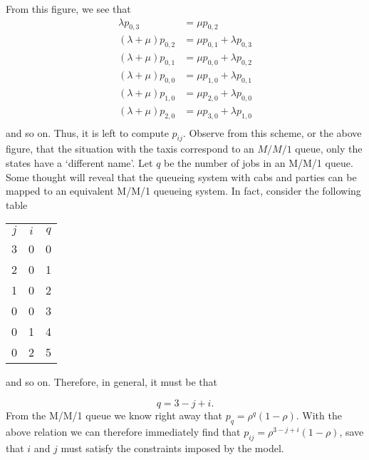 \begin{exercise}[Hall 5.22]
\begin{solution}
\begin{center}
 
 \end{center}

From this figure, we see that
\begin{align*}
\lambda p_{0,3} &= \mu p_{0,2} \\
(\lambda+\mu) p_{0,2} &= \mu p_{0,1} + \lambda p_{0,3}\\
(\lambda+\mu) p_{0,1} &= \mu p_{0,0} + \lambda p_{0,2}\\
(\lambda+\mu) p_{0,0} &= \mu p_{1,0} + \lambda p_{0,1}\\
(\lambda+\mu) p_{1,0} &= \mu p_{2,0} + \lambda p_{0,0}\\
(\lambda+\mu) p_{2,0} &= \mu p_{3,0} + \lambda p_{1,0}\\
\end{align*}
and so on. Thus, it is left to compute $p_{ij}$. Observe from this
scheme, or the above figure, that the situation with the taxis
correspond to an $M/M/1$ queue, only the states have a `different
name'. Let $q$ be the number of jobs in an M/M/1 queue. Some thought
will reveal that the queueing system with cabs and parties can be
mapped to an equivalent M/M/1 queueing system. In fact, consider the
following table
\begin{center}
\begin{tabular}{ccc}
$j$ & $i$ & $q$\\
3& 0 & 0\\
2 & 0& 1\\
1 & 0& 2\\
0& 0& 3\\
0& 1& 4\\
0& 2& 5\\
\end{tabular}
\end{center}
and so on. Therefore, in general, it must be that 

\begin{equation*}
q = 3 - j +i.
\end{equation*}
From the M/M/1 queue we know right away that $p_q = \rho^q
(1-\rho)$. With the above relation we can therefore immediately find
that $p_{ij} = \rho^{3-j+i}(1-\rho)$, save that $i$ and
$j$ must satisfy the constraints imposed by the model.


\end{solution}
\end{exercise}
